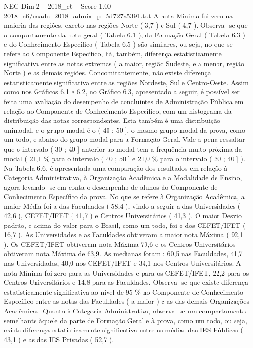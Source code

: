 \begin{textsample}{NEG Dim 2 – 2018\_c6 – Score 1.00 – 2018\_c6/enade\_2018\_admin\_p\_5d727a5391.txt}
A nota Mínima foi zero na maioria das regiões, exceto nas regiões Norte ( 3,7 ) e Sul ( 4,7 ).
Observa -se que o comportamento da nota geral ( Tabela 6.1 ), da Formação Geral ( Tabela 6.3 ) e do Conhecimento Específico ( Tabela 6.5 ) são similares, ou seja, no que se refere ao Componente Específico, há, também, diferença estatisticamente significativa entre as notas extremas ( a maior, região Sudeste, e a menor, região Norte ) e as demais regiões.
Concomitantemente, não existe diferença estatisticamente significativa entre as regiões Nordeste, Sul e Centro-Oeste.
Assim como nos Gráficos 6.1 e 6.2, no Gráfico 6.3, apresentado a seguir, é possível ser feita uma avaliação do desempenho de concluintes de Administração Pública em relação ao Componente de Conhecimento Específico, com um histograma da distribuição das notas correspondentes.
Esta também é uma distribuição unimodal, e o grupo modal é o ( 40 ; 50 ], o mesmo grupo modal da prova, como um todo, e abaixo do grupo modal para a Formação Geral.
Vale a pena ressaltar que o intervalo ( 30 ; 40 ] anterior ao modal tem a frequência muito próxima da modal ( 21,1 \% para o intervalo ( 40 ; 50 ] e 21,0 \% para o intervalo ( 30 ; 40 ] ).
Na Tabela 6.6, é apresentada uma comparação dos resultados em relação à Categoria Administrativa, à Organização Acadêmica e a Modalidade de Ensino, agora levando -se em conta o desempenho de alunos do Componente de Conhecimento Específico da prova.
No que se refere à Organização Acadêmica, a maior Média foi a das Faculdades ( 58,4 ), vindo a seguir a das Universidades ( 42,6 ), CEFET/IFET ( 41,7 ) e Centros Universitários ( 41,3 ).
O maior Desvio padrão, e acima do valor para o Brasil, como um todo, foi o dos CEFET/IFET ( 16,7 ).
As Universidades e as Faculdades obtiveram a maior nota Máxima ( 92,1 ).
Os CEFET/IFET obtiveram nota Máxima 79,6 e os Centros Universitários obtiveram nota Máxima de 63,9.
As medianas foram : 60,5 nas Faculdades, 41,7 nas Universidades, 40,0 nos CEFET/IFET e 34,1 nos Centros Universitários.
A nota Mínima foi zero para as Universidades e para os CEFET/IFET, 22,2 para os Centros Universitários e 14,8 para as Faculdades.
Observa -se que existe diferença estatisticamente significativa ao nível de 95 \% no Componente de Conhecimento Específico entre as notas das Faculdades ( a maior ) e as das demais Organizações Acadêmicas.
Quanto à Categoria Administrativa, observa -se um comportamento semelhante àquele da parte de Formação Geral e à prova, como um todo, ou seja, existe diferença estatisticamente significativa entre as médias das IES Públicas ( 43,1 ) e as das IES Privadas ( 52,7 ).

\end{textsample}
